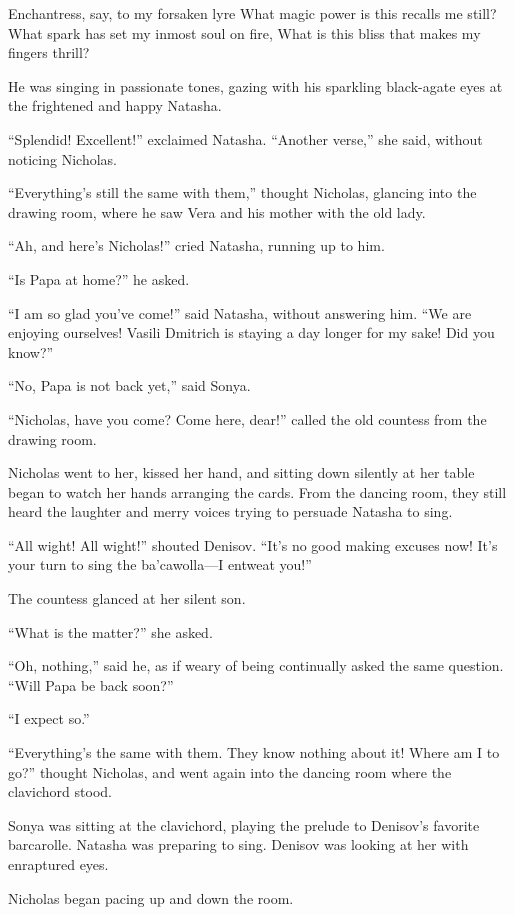 Enchantress, say, to my forsaken lyre What magic power is this
recalls me still? What spark has set my inmost soul on fire, What
is this bliss that makes my fingers thrill?

He was singing in passionate tones, gazing with his sparkling
black-agate eyes at the frightened and happy Natasha.

``Splendid! Excellent!'' exclaimed Natasha. ``Another verse,''
she said, without noticing Nicholas.

``Everything's still the same with them,'' thought Nicholas,
glancing into the drawing room, where he saw Vera and his mother
with the old lady.

``Ah, and here's Nicholas!'' cried Natasha, running up to him.

``Is Papa at home?'' he asked.

``I am so glad you've come!'' said Natasha, without answering
him. ``We are enjoying ourselves! Vasili Dmitrich is staying a
day longer for my sake!  Did you know?''

``No, Papa is not back yet,'' said Sonya.

``Nicholas, have you come? Come here, dear!'' called the old
countess from the drawing room.

Nicholas went to her, kissed her hand, and sitting down silently
at her table began to watch her hands arranging the cards. From
the dancing room, they still heard the laughter and merry voices
trying to persuade Natasha to sing.

``All wight! All wight!'' shouted Denisov. ``It's no good making
excuses now! It's your turn to sing the ba'cawolla---I entweat
you!''

The countess glanced at her silent son.

``What is the matter?'' she asked.

``Oh, nothing,'' said he, as if weary of being continually asked
the same question. ``Will Papa be back soon?''

``I expect so.''

``Everything's the same with them. They know nothing about it!
Where am I to go?'' thought Nicholas, and went again into the
dancing room where the clavichord stood.

Sonya was sitting at the clavichord, playing the prelude to
Denisov's favorite barcarolle. Natasha was preparing to
sing. Denisov was looking at her with enraptured eyes.

Nicholas began pacing up and down the room.

